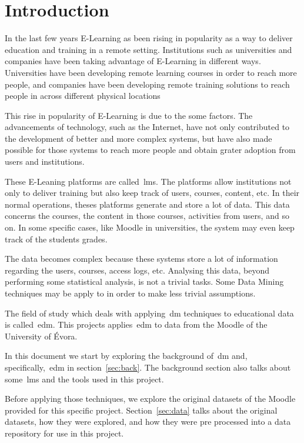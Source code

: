 \chapter{Introduction}

In the last few years E-Learning as been rising in popularity as a way to
deliver education and training in a remote setting. Institutions such as
universities and companies have been taking advantage of E-Learning in
different ways. Universities have been developing remote learning courses in
order to reach more people, and companies have been developing remote training
solutions to reach people in across different physical locations

This rise in popularity of E-Learning is due to the some factors. The
advancements of technology, such as the Internet, have not only contributed to
the development of better and more complex systems, but have also made possible
for those systems to reach more people and obtain grater adoption from users
and institutions.

These E-Leaning platforms are called~\gls{lms}. The platforms
allow institutions not only to deliver training but also keep track of users,
courses, content, etc. In their normal operations, theses platforms generate
and store a lot of data. This data concerns the courses, the content in those
courses, activities from users, and so on. In some specific cases, like Moodle
in universities, the system may even keep track of the students grades.

The data becomes complex because these systems store a lot of information
regarding the users, courses, access logs, etc. Analysing this data, beyond
performing some statistical analysis, is not a trivial tasks. Some Data Mining
techniques may be apply to in order to make less trivial assumptions.

The field of study which deals with applying~\gls{dm} techniques to educational
data is called~\gls{edm}. This projects applies~\gls{edm} to data from the
Moodle of the University of Évora.~\cite{ind_010, ind_011, ind_013, ind_014,
ind_015}

In this document we start by exploring the background of~\gls{dm} and,
specifically,~\gls{edm} in section~\ref{sec:back}. The background section also
talks about some~\gls{lms} and the tools used in this project.

Before applying those techniques, we explore the original datasets of the
Moodle provided for this specific project. Section~\ref{sec:data} talks about
the original datasets, how they were explored, and how they were pre processed
into a data repository for use in this project.

